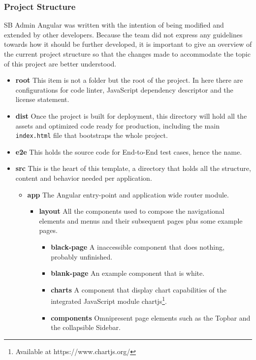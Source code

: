 \subsubsection{Project Structure}
SB Admin Angular was written with the intention of being modified and extended by other developers. Because the team did not express any guidelines towards how it should be further developed, it is important to give an overview of the current project structure so that the changes made to accommodate the topic of this project are better understood.

\begin{itemize}
\item \textbf{root} This item is not a folder but the root of the project. In here there are configurations for code linter, JavaScript dependency descriptor and the license statement.
\item \textbf{dist} Once the project is built for deployment, this directory will hold all the assets and optimized code ready for production, including the main \texttt{index.html} file that bootstraps the whole project.
\item \textbf{e2e} This holds the source code for End-to-End test cases, hence the name.
\item \textbf{src} This is the heart of this template, a directory that holds all the structure, content and behavior needed per application. \leavevmode
  \begin{itemize}
  \item \textbf{app} The Angular entry-point and application wide router module. \leavevmode
    \begin{itemize}
    \item \textbf{layout} All the components used to compose the navigational elements and menus and their subsequent pages plus some example pages. \leavevmode
      \begin{itemize}
      \item \textbf{black-page} A inaccessible component that does nothing, probably unfinished.
      \item \textbf{blank-page} An example component that is white.
      \item \textbf{charts} A component that display chart capabilities of the integrated JavaScript module chartjs\footnote{Available at https://www.chartjs.org/}.
          \item \textbf{components} Omnipresent page elements such as the Topbar and the collapsible Sidebar.\leavevmode
        \begin{itemize}

\end{itemize}
\end{itemize}
\end{itemize}
\end{itemize}
\end{itemize}
